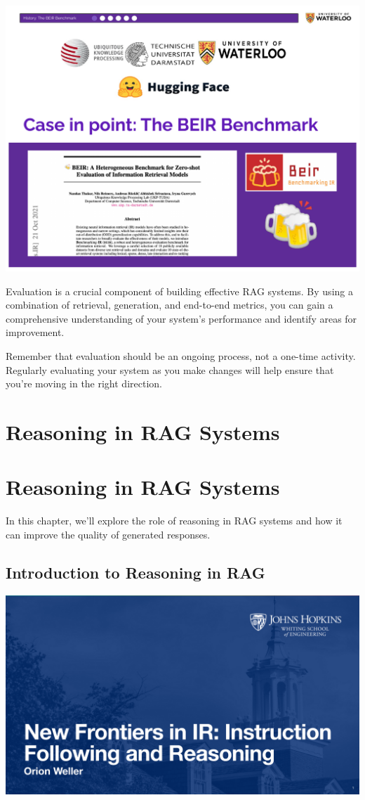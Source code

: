 \documentclass[
  letterpaper,
  oneside]{scrbook}
\begin{document}
\includegraphics{chapters/../p2-images/slide_9.png}

Evaluation is a crucial component of building effective RAG systems. By
using a combination of retrieval, generation, and end-to-end metrics,
you can gain a comprehensive understanding of your system's performance
and identify areas for improvement.

Remember that evaluation should be an ongoing process, not a one-time
activity. Regularly evaluating your system as you make changes will help
ensure that you're moving in the right direction.

\chapter{Reasoning in RAG Systems}\label{reasoning-in-rag-systems}

\chapter{Reasoning in RAG Systems}\label{reasoning-in-rag-systems-1}

In this chapter, we'll explore the role of reasoning in RAG systems and
how it can improve the quality of generated responses.

\section{Introduction to Reasoning in
RAG}\label{introduction-to-reasoning-in-rag}

\includegraphics{chapters/../p3-images/slide_1.png}
\end{document}
